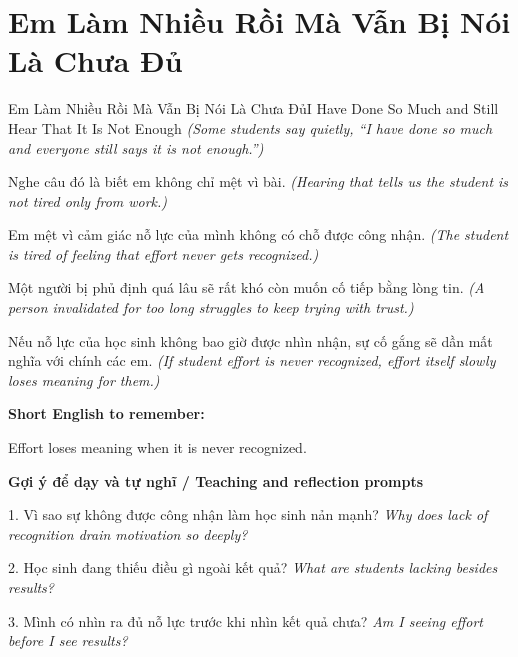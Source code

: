 \section{Em Làm Nhiều Rồi Mà Vẫn Bị Nói Là Chưa Đủ}
\begin{truyen}{Em Làm Nhiều Rồi Mà Vẫn Bị Nói Là Chưa Đủ}{I Have Done So Much and Still Hear That It Is Not Enough}
\textit{(Some students say quietly, “I have done so much and everyone still says it is not enough.”)}

Nghe câu đó là biết em không chỉ mệt vì bài.
\textit{(Hearing that tells us the student is not tired only from work.)}

Em mệt vì cảm giác nỗ lực của mình không có chỗ được công nhận.
\textit{(The student is tired of feeling that effort never gets recognized.)}

Một người bị phủ định quá lâu sẽ rất khó còn muốn cố tiếp bằng lòng tin.
\textit{(A person invalidated for too long struggles to keep trying with trust.)}

\end{truyen}

\begin{baihoc}
Nếu nỗ lực của học sinh không bao giờ được nhìn nhận, sự cố gắng sẽ dần mất nghĩa với chính các em.
\textit{(If student effort is never recognized, effort itself slowly loses meaning for them.)}
\end{baihoc}

\begin{ghinhoanh}
\textbf{Short English to remember:}

Effort loses meaning when it is never recognized.

\end{ghinhoanh}

\begin{tuhocnhanh}
\textbf{Gợi ý để dạy và tự nghĩ / Teaching and reflection prompts}

1. Vì sao sự không được công nhận làm học sinh nản mạnh? \textit{Why does lack of recognition drain motivation so deeply?}

2. Học sinh đang thiếu điều gì ngoài kết quả? \textit{What are students lacking besides results?}

3. Mình có nhìn ra đủ nỗ lực trước khi nhìn kết quả chưa? \textit{Am I seeing effort before I see results?}
\end{tuhocnhanh}
\ngancach

